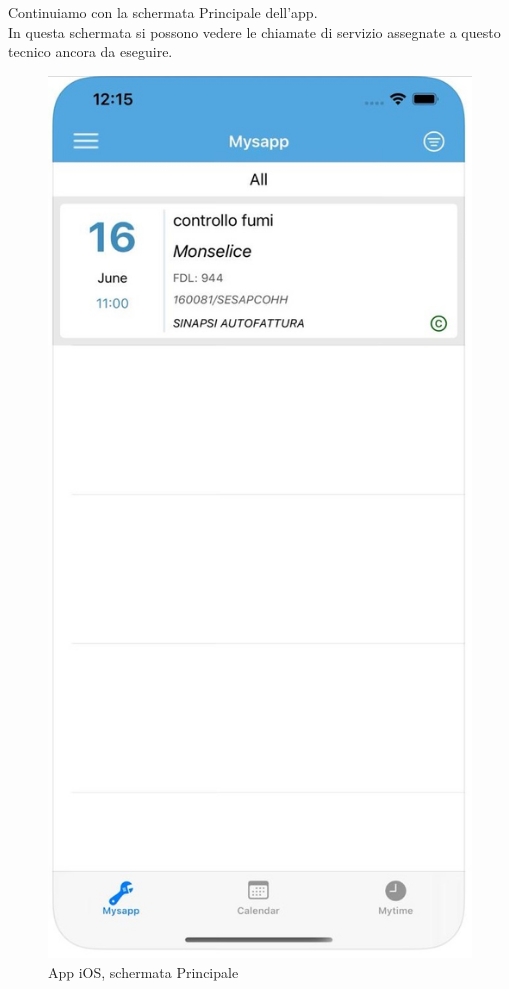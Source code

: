 	Continuiamo con la schermata Principale dell'app.
	\\In questa schermata si possono vedere le chiamate di servizio assegnate a questo tecnico ancora da eseguire.

\begin{figure}[!h] 
	\centering 
	\includegraphics[scale = 0.13]{immagini/app iOS/elenco-interventi-iOS.jpeg} 
	\caption {App iOS, schermata Principale}
	\label{fig:2-15}
\end{figure}
